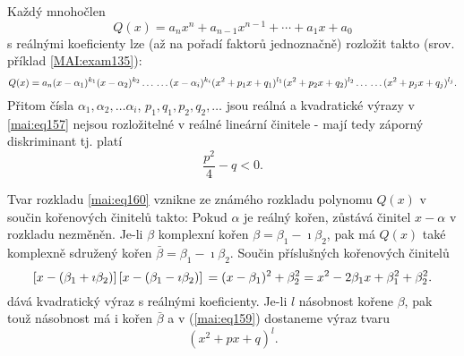       \begin{mdframed}[style=mdmathlemma] 
        \begin{lemma}\label{mai:lemma010}
          Každý mnohočlen
          \begin{equation*}
            Q(x) = a_nx^n + a_{n-1}x^{n-1} + \cdots + a_1x + a_0
          \end{equation*}
          s reálnými koeficienty lze (až na pořadí faktorů jednoznačně) rozložit takto (srov.
          příklad \ref{MAI:exam135}):
          \begin{equation}\label{mai:eq159}
            Q(x) = a_n(x-\alpha_1)^{k_1}(x-\alpha_2)^{k_2}\ldots                   \notag \\
            \ldots(x-\alpha_i)^{k_i}(x^2+p_1x+q_1)^{l_1}(x^2+p_2x+q_2)^{l_2}\ldots \notag \\ 
            \ldots(x^2+p_jx+q_j)^{l_j}.
          \end{equation}
          Přitom čísla \(\alpha_1, \alpha_2, \ldots \alpha_i\), \(p_1, q_1, p_2, q_2, \ldots \) jsou
          reálná a kvadratické výrazy v \ref{mai:eq157} nejsou rozložitelné v reálné lineární
          činitele - mají tedy záporný diskriminant tj. platí
          \begin{equation}\label{mai:eq160}
            \frac{p^2}{4}-q<0.
          \end{equation} 
        \end{lemma}
      \end{mdframed}

      Tvar rozkladu \ref{mai:eq160} vznikne ze známého rozkladu polynomu \(Q(x)\) v součin
      kořenových činitelů takto: Pokud \(\alpha\) je reálný kořen, zůstává činitel \(x-\alpha\) v
      rozkladu nezměněn. Je-li \(\beta\) komplexní kořen \(\beta = \beta_1-\imath\beta_2\), pak má
      \(Q(x)\) také komplexně sdružený kořen \(\bar{\beta} = \beta_1-\imath\beta_2\). Součin
      příslušných kořenových činitelů
      \begin{equation}\label{mai:eq161}
        \left[x-(\beta_1+\imath\beta_2)\right]  
        \left[x-(\beta_1-\imath\beta_2)\right]                                     \notag \\
        = (x-\beta_1)^2+\beta^2_2 = x^2-2\beta_1x + \beta^2_1+\beta^2_2. 
      \end{equation}
      dává kvadratický výraz s reálnými koeficienty. Je-li \(l\) násobnost kořene \(\beta\), pak
      touž násobnost má i kořen \(\bar{\beta}\) a v (\ref{mai:eq159}) dostaneme výraz tvaru
      \begin{equation*}
        (x^2+px+q)^l.
      \end{equation*}

